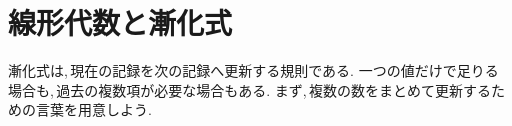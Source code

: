 \chapter{線形代数と漸化式}\label{章：線形代数と漸化式}
\begin{bookcolumns}
漸化式は,\,現在の記録を次の記録へ更新する規則である.
一つの値だけで足りる場合も,\,過去の複数項が必要な場合もある.
まず,\,複数の数をまとめて更新するための言葉を用意しよう.




\end{bookcolumns}
